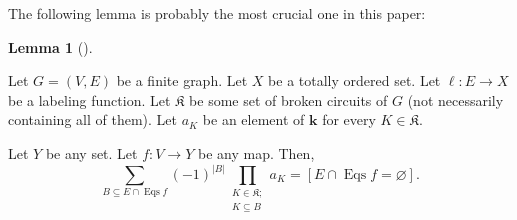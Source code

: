 \documentclass[numbers=enddot,12pt,final,onecolumn,notitlepage]{scrartcl}%
\theoremstyle{definition}
\newtheorem{lem}[theo]{Lemma}
\newenvironment{lemma}[1][]
{\begin{lem}[#1]\begin{leftbar}}
{\end{leftbar}\end{lem}}
\let\sumnonlimits\sum
\let\prodnonlimits\prod
\renewcommand{\sum}{\sumnonlimits\limits}
\renewcommand{\prod}{\prodnonlimits\limits}
\begin{document}
The following lemma is probably the most crucial one in this paper:

\begin{lemma}
\label{lem.NBCm.moeb}Let $G=\left(  V,E\right)  $ be a finite graph. Let $X$
be a totally ordered set. Let $\ell:E\rightarrow X$ be a labeling function.
Let $\mathfrak{K}$ be some set of broken circuits of $G$ (not necessarily
containing all of them). Let $a_{K}$ be an element of $\mathbf{k}$ for every
$K\in\mathfrak{K}$.

Let $Y$ be any set. Let $f:V\rightarrow Y$ be any map. Then,%
\[
\sum_{B\subseteq E\cap\operatorname*{Eqs}f}\left(  -1\right)  ^{\left\vert
B\right\vert }\prod_{\substack{K\in\mathfrak{K};\\K\subseteq B}}a_{K}=\left[
E\cap\operatorname*{Eqs}f=\varnothing\right]  .
\]

\end{lemma}
\end{document}
